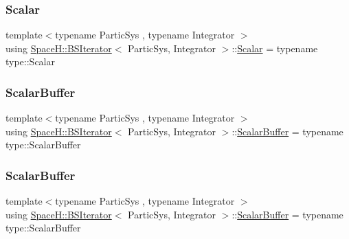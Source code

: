 \mbox{\label{class_space_h_1_1_b_s_iterator_a89993409583b3022709bdfd84ea8149d}} 
\subsubsection{\texorpdfstring{Scalar}{Scalar}\hspace{0.1cm}{\footnotesize\ttfamily [2/2]}}
{\footnotesize\ttfamily template$<$typename Partic\+Sys , typename Integrator $>$ \\
using \mbox{\hyperlink{class_space_h_1_1_b_s_iterator}{Space\+H\+::\+B\+S\+Iterator}}$<$ Partic\+Sys, Integrator $>$\+::\mbox{\hyperlink{class_space_h_1_1_b_s_iterator_a89993409583b3022709bdfd84ea8149d}{Scalar}} =  typename type\+::\+Scalar}

\mbox{\label{class_space_h_1_1_b_s_iterator_a3c3609d40e0ac4268760adeb1f0514de}} 
\subsubsection{\texorpdfstring{Scalar\+Buffer}{ScalarBuffer}\hspace{0.1cm}{\footnotesize\ttfamily [1/2]}}
{\footnotesize\ttfamily template$<$typename Partic\+Sys , typename Integrator $>$ \\
using \mbox{\hyperlink{class_space_h_1_1_b_s_iterator}{Space\+H\+::\+B\+S\+Iterator}}$<$ Partic\+Sys, Integrator $>$\+::\mbox{\hyperlink{class_space_h_1_1_b_s_iterator_a3c3609d40e0ac4268760adeb1f0514de}{Scalar\+Buffer}} =  typename type\+::\+Scalar\+Buffer}

\mbox{\label{class_space_h_1_1_b_s_iterator_a3c3609d40e0ac4268760adeb1f0514de}} 
\subsubsection{\texorpdfstring{Scalar\+Buffer}{ScalarBuffer}\hspace{0.1cm}{\footnotesize\ttfamily [2/2]}}
{\footnotesize\ttfamily template$<$typename Partic\+Sys , typename Integrator $>$ \\
using \mbox{\hyperlink{class_space_h_1_1_b_s_iterator}{Space\+H\+::\+B\+S\+Iterator}}$<$ Partic\+Sys, Integrator $>$\+::\mbox{\hyperlink{class_space_h_1_1_b_s_iterator_a3c3609d40e0ac4268760adeb1f0514de}{Scalar\+Buffer}} =  typename type\+::\+Scalar\+Buffer}

